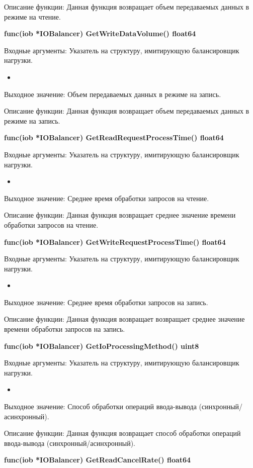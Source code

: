 Описание функции: Данная функция возвращает объем передаваемых данных в режиме на чтение.

\textbf{func(iob *IOBalancer) GetWriteDataVolume() float64}

Входные аргументы: Указатель на структуру, имитирующую балансировщик нагрузки.
\begin{itemize}
	\item 
\end{itemize}
Выходное значение: Объем передаваемых данных в режиме на запись. 

Описание функции: Данная функция возвращает объем передаваемых данных в режиме на запись.

\textbf{func(iob *IOBalancer) GetReadRequestProcessTime() float64}

Входные аргументы: Указатель на структуру, имитирующую балансировщик нагрузки.
\begin{itemize}
	\item 
\end{itemize}
Выходное значение: Среднее время обработки запросов на чтение.

Описание функции: Данная функция возвращает среднее значение времени обработки запросов на чтение.

\textbf{func(iob *IOBalancer) GetWriteRequestProcessTime() float64}

Входные аргументы: Указатель на структуру, имитирующую балансировщик нагрузки.
\begin{itemize}
	\item 
\end{itemize}
Выходное значение: Среднее время обработки запросов на запись.

Описание функции: Данная функция возвращает возвращает среднее значение времени обработки запросов на запись.

\textbf{func(iob *IOBalancer) GetIoProcessingMethod() uint8}

Входные аргументы: Указатель на структуру, имитирующую балансировщик нагрузки.
\begin{itemize}
	\item 
\end{itemize}
Выходное значение: Способ обработки операций ввода-вывода (синхронный/асинхронный).

Описание функции: Данная функция возвращает способ обработки операций ввода-вывода (синхронный/асинхронный).

\textbf{func(iob *IOBalancer) GetReadCancelRate() float64}

